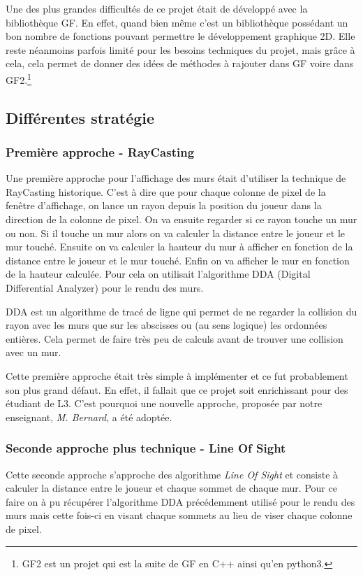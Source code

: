 \documentclass[12pt]{report}
\begin{document}
Une des plus grandes difficultés de ce projet était de développé avec la bibliothèque GF. En effet, quand bien même c'est un bibliothèque possédant un bon nombre de fonctions pouvant permettre le développement graphique 2D. Elle reste néanmoins parfois limité pour les besoins techniques du projet, mais grâce à cela, cela permet de donner des idées de méthodes à rajouter dans GF voire dans GF2.\footnote{GF2 est un projet qui est la suite de GF en C++ ainsi qu'en python3.}

\subsection{Différentes stratégie}
\subsubsection{Première approche - RayCasting}

Une première approche pour l'affichage des murs était d'utiliser la technique de RayCasting historique. C'est à dire que pour chaque colonne de pixel de la fenêtre
d'affichage, on lance un rayon depuis la position du joueur dans la direction de la colonne de pixel. On va ensuite regarder si ce rayon touche un mur ou non. 
Si il touche un mur alors on va calculer la distance entre le joueur et le mur touché. 
Ensuite on va calculer la hauteur du mur à afficher en fonction de la distance entre le joueur et le mur touché. 
Enfin on va afficher le mur en fonction de la hauteur calculée.
Pour cela on utilisait l'algorithme DDA (Digital Differential Analyzer) pour le rendu des murs.

DDA est un algorithme de tracé de ligne qui permet de ne regarder la collision du rayon avec les murs que sur les abscisses ou (au sens logique) les ordonnées entières.
Cela permet de faire très peu de calculs avant de trouver une collision avec un mur.

Cette première approche était très simple à implémenter et ce fut probablement son plus grand défaut. En effet, il fallait que ce projet soit enrichissant
pour des étudiant de L3. C'est pourquoi une nouvelle approche, proposée par notre enseignant, \textit{M. Bernard}, a été adoptée.
\subsubsection{Seconde approche plus technique - Line Of Sight}

Cette seconde approche s'approche des algorithme \textit{Line Of Sight} et consiste à calculer la distance entre le joueur et chaque sommet de chaque mur.
Pour ce faire on à pu récupérer l'algorithme DDA précédemment utilisé pour le rendu des murs mais cette fois-ci 
en visant chaque sommets au lieu de viser chaque colonne de pixel.
\end{document}
